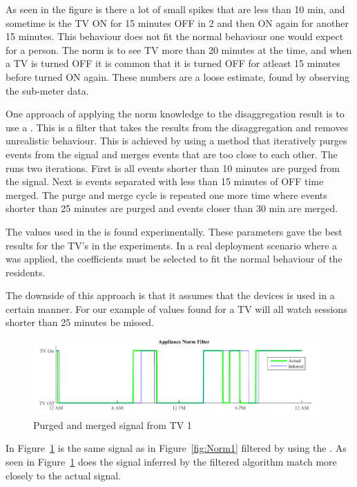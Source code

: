 As seen in the figure is there a lot of small spikes that are less than 10 min, and sometime is the TV ON for 15 minutes OFF in 2 and then ON again for another 15 minutes. This behaviour does not fit the normal behaviour one would expect for a person. The norm is to see TV more than 20 minutes at the time, and when a TV is turned OFF it is common that it is turned OFF for atleast 15 minutes before turned ON again. These numbers are a loose estimate, found by observing the sub-meter data. 


One approach of applying the norm knowledge to the disaggregation result is to use a . This is a filter that takes the results from the disaggregation and removes unrealistic behaviour. This is achieved by using a method that iteratively purges events from the signal and merges events that are too close to each other. The  runs two iterations. First is all events shorter than 10 minutes are purged from the signal. Next is events separated with less than 15 minutes of OFF time merged. The purge and merge cycle is repeated one more time where events shorter than 25 minutes are purged and events closer than 30 min are merged. 

The values used in the  is found experimentally. These parameters gave the best results for the TV's in the experiments. In a real deployment scenario where a  was applied, the coefficients must be selected to fit the normal behaviour of the residents.

The downside of this approach is that it assumes that the devices is used in a certain manner. For our example of values found for a TV will all watch sessions shorter than 25 minutes be missed.

\begin{figure}[H]
\centering
\includegraphics[width=1\textwidth]{billeder/AppNormFilterH10_2.png}
\caption{Purged and merged signal from TV 1}
\label{fig:Norm2}
\end{figure}

In Figure~\ref{fig:Norm2} is the same signal as in Figure~\ref{fig:Norm1} filtered by using the . As seen in Figure~\ref{fig:Norm2} does the signal inferred by the filtered  algorithm match more closely to the actual signal. 

